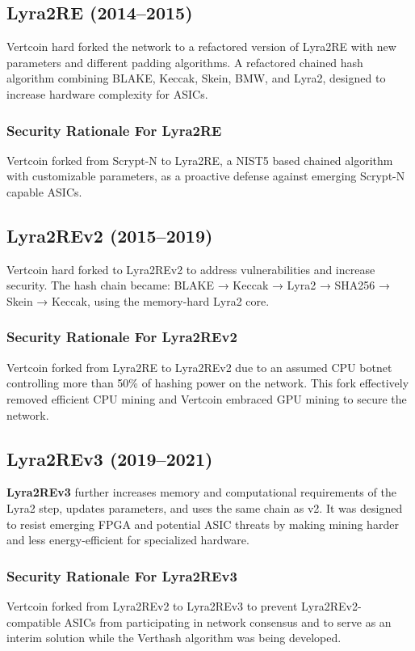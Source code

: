 \documentclass[12pt]{article}
\begin{document}
\subsection{Lyra2RE (2014--2015)}
Vertcoin hard forked the network to a refactored version of Lyra2RE with new parameters and different padding algorithms. A refactored chained hash algorithm combining BLAKE, Keccak, Skein, BMW, and Lyra2, designed to increase hardware complexity for ASICs. 

\subsubsection{Security Rationale For Lyra2RE}
Vertcoin forked from Scrypt-N to Lyra2RE, a NIST5 based chained algorithm with customizable parameters, as a proactive defense against emerging Scrypt-N capable ASICs.

\subsection{Lyra2REv2 (2015--2019)}
Vertcoin hard forked to Lyra2REv2 to address vulnerabilities and increase security. The hash chain became: BLAKE → Keccak → Lyra2 → SHA256 → Skein → Keccak, using the memory-hard Lyra2 core.

\subsubsection{Security Rationale For Lyra2REv2}
Vertcoin forked from Lyra2RE to Lyra2REv2 due to an assumed CPU botnet controlling more than 50\% of hashing power on the network.  This fork effectively removed efficient CPU mining and Vertcoin embraced GPU mining to secure the network.

\subsection{Lyra2REv3 (2019--2021)}
\textbf{Lyra2REv3} further increases memory and computational requirements of the Lyra2 step, updates parameters, and uses the same chain as v2. It was designed to resist emerging FPGA and potential ASIC threats by making mining harder and less energy-efficient for specialized hardware.

\subsubsection{Security Rationale For Lyra2REv3}
Vertcoin forked from Lyra2REv2 to Lyra2REv3 to prevent Lyra2REv2-compatible ASICs from participating in network consensus and to serve as an interim solution while the Verthash algorithm was being developed.
\end{document}
